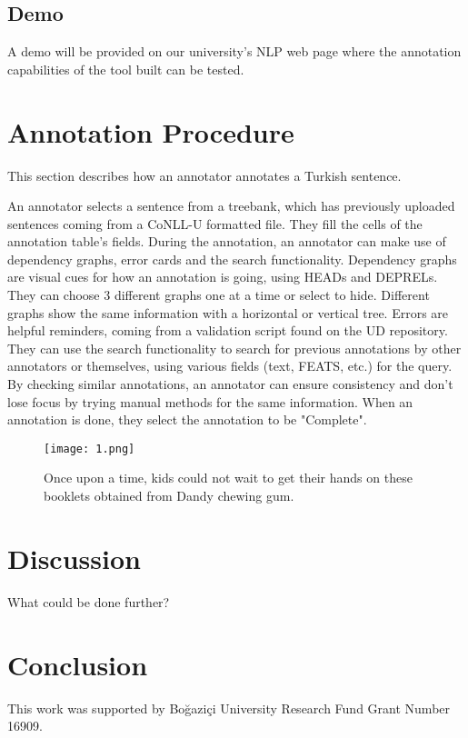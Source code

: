 \documentclass[
]{ceurart}
\begin{document}
\subsection{Demo}
\label{sec:demo}

A demo will be provided on our university's NLP web page where the annotation capabilities of the tool built can be tested.

\section{Annotation Procedure}
\label{sec:annotation}
This section describes how an annotator annotates a Turkish sentence.

An annotator selects a sentence from a treebank, which has previously uploaded sentences coming from a CoNLL-U formatted file.
They fill the cells of the annotation table's fields.
During the annotation, an annotator can make use of dependency graphs, error cards and the search functionality.
Dependency graphs are visual cues for how an annotation is going, using HEADs and DEPRELs.
They can choose 3 different graphs one at a time or select to hide.
Different graphs show the same information with a horizontal or vertical tree.
Errors are helpful reminders, coming from a validation script found on the UD repository.
They can use the search functionality to search for previous annotations by other annotators or themselves, using various fields (text, FEATS, etc.) for the query.
By checking similar annotations, an annotator can ensure consistency and don't lose focus by trying manual methods for the same information.
When an annotation is done, they select the annotation to be "Complete".

\begin{figure}[tbh]
\centering
\texttt{[image: 1.png]}
\caption{Once upon a time, kids could not wait to get their hands on these booklets obtained from Dandy chewing gum.}
\label{fig:demo-fig}
\end{figure}

\section{Discussion}
\label{sec:discussion}

What could be done further?

\section{Conclusion}
\label{sec:conclusion}

\begin{acknowledgments}
This work was supported by Boğaziçi University Research Fund Grant Number 16909.
\end{acknowledgments}


\end{document}
